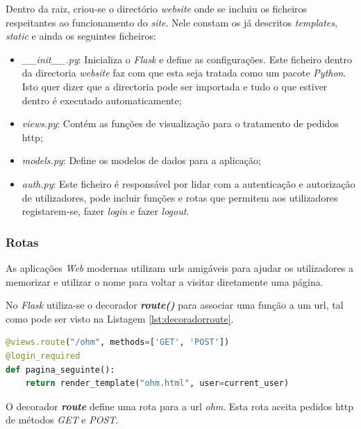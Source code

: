 Dentro da raiz, criou-se o directório \textit{website} onde se incluiu os ficheiros respeitantes ao funcionamento do \textit{site}. Nele constam os já descritos \textit{templates}, \textit{static} e ainda os seguintes ficheiros:

\begin{itemize}
	\item \textit{\_\_init\_\_.py}: Inicializa o \textit{Flask} e define as configurações. Este ficheiro dentro da directoria \textit{website} faz com que esta seja tratada como um pacote \textit{Python}. Isto quer dizer que a directoria pode ser importada e tudo o que estiver dentro é executado automaticamente;
	\item \textit{views.py}: Contém as funções de visualização para o tratamento de pedidos \acrfull{http};
	\item \textit{models.py}: Define os modelos de dados para a aplicação;
	\item \textit{auth.py}: Este ficheiro é responsável por lidar com a autenticação e autorização de utilizadores, pode incluir funções e rotas que permitem aos utilizadores registarem-se, fazer \textit{login} e fazer \textit{logout}.
\end{itemize}

\subsubsection{Rotas}
As aplicações \textit{Web} modernas utilizam \acrshort{url}s amigáveis para ajudar os utilizadores a memorizar e utilizar o nome para voltar a visitar diretamente uma página.

No \textit{Flask} utiliza-se o decorador \textit{\textbf{route()}} para associar uma função a um \acrshort{url}, tal como pode ser visto na Listagem \ref{lst:decoradorroute}.

\begin{minipage}{0.9\linewidth}
	\begin{lstlisting}[language=Python, caption=Decorador \textit{route()} - \textit{views.py}, label=lst:decoradorroute]
@views.route("/ohm", methods=['GET', 'POST'])
@login_required
def pagina_seguinte():
    return render_template("ohm.html", user=current_user)
\end{lstlisting}
\end{minipage}

O decorador \textit{\textbf{route}} define uma rota para a \acrshort{url} \textit{ohm}. Esta rota aceita pedidos \acrshort{http} de métodos \textit{GET} e \textit{POST}.

